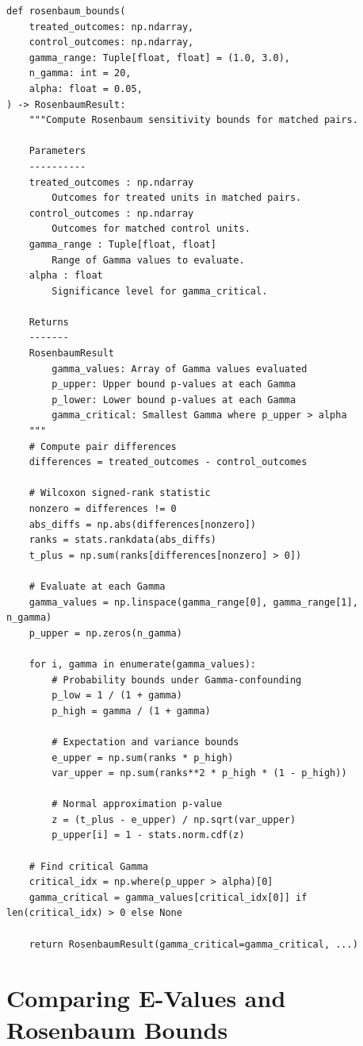 \begin{verbatim}
def rosenbaum_bounds(
    treated_outcomes: np.ndarray,
    control_outcomes: np.ndarray,
    gamma_range: Tuple[float, float] = (1.0, 3.0),
    n_gamma: int = 20,
    alpha: float = 0.05,
) -> RosenbaumResult:
    """Compute Rosenbaum sensitivity bounds for matched pairs.

    Parameters
    ----------
    treated_outcomes : np.ndarray
        Outcomes for treated units in matched pairs.
    control_outcomes : np.ndarray
        Outcomes for matched control units.
    gamma_range : Tuple[float, float]
        Range of Gamma values to evaluate.
    alpha : float
        Significance level for gamma_critical.

    Returns
    -------
    RosenbaumResult
        gamma_values: Array of Gamma values evaluated
        p_upper: Upper bound p-values at each Gamma
        p_lower: Lower bound p-values at each Gamma
        gamma_critical: Smallest Gamma where p_upper > alpha
    """
    # Compute pair differences
    differences = treated_outcomes - control_outcomes

    # Wilcoxon signed-rank statistic
    nonzero = differences != 0
    abs_diffs = np.abs(differences[nonzero])
    ranks = stats.rankdata(abs_diffs)
    t_plus = np.sum(ranks[differences[nonzero] > 0])

    # Evaluate at each Gamma
    gamma_values = np.linspace(gamma_range[0], gamma_range[1], n_gamma)
    p_upper = np.zeros(n_gamma)

    for i, gamma in enumerate(gamma_values):
        # Probability bounds under Gamma-confounding
        p_low = 1 / (1 + gamma)
        p_high = gamma / (1 + gamma)

        # Expectation and variance bounds
        e_upper = np.sum(ranks * p_high)
        var_upper = np.sum(ranks**2 * p_high * (1 - p_high))

        # Normal approximation p-value
        z = (t_plus - e_upper) / np.sqrt(var_upper)
        p_upper[i] = 1 - stats.norm.cdf(z)

    # Find critical Gamma
    critical_idx = np.where(p_upper > alpha)[0]
    gamma_critical = gamma_values[critical_idx[0]] if len(critical_idx) > 0 else None

    return RosenbaumResult(gamma_critical=gamma_critical, ...)
\end{verbatim}

\section{Comparing E-Values and Rosenbaum Bounds}
\label{sec:comparison}

